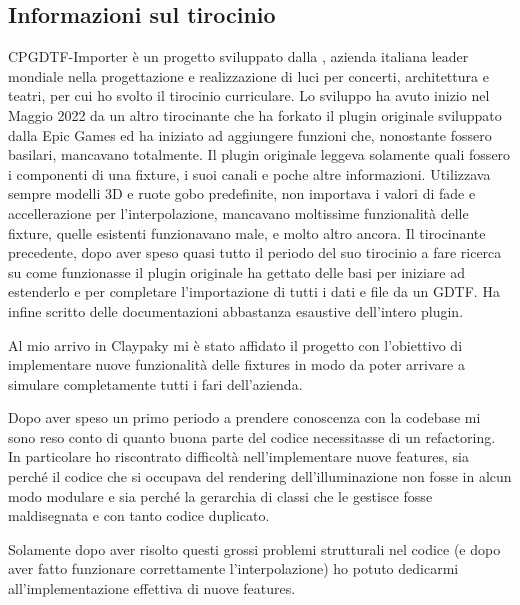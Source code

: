 \documentclass[main.tex]{subfiles}
\begin{document}
\subsection{Informazioni sul tirocinio}\label{subsec:1_tirocinio}
CPGDTF-Importer è un progetto sviluppato dalla , azienda italiana leader mondiale nella progettazione e realizzazione di luci per concerti, architettura e teatri, per cui ho svolto il tirocinio curriculare. Lo sviluppo ha avuto inizio nel Maggio 2022 da un altro tirocinante che ha forkato il plugin originale sviluppato dalla Epic Games ed ha iniziato ad aggiungere funzioni che, nonostante fossero basilari, mancavano totalmente. Il plugin originale leggeva solamente quali fossero i componenti di una fixture, i suoi canali e poche altre informazioni. Utilizzava sempre modelli 3D e ruote gobo predefinite, non importava i valori di fade e accellerazione per l'interpolazione, mancavano moltissime funzionalità delle fixture, quelle esistenti funzionavano male, e molto altro ancora. Il tirocinante precedente, dopo aver speso quasi tutto il periodo del suo tirocinio a fare ricerca su come funzionasse il plugin originale ha gettato delle basi per iniziare ad estenderlo e per completare l'importazione di tutti i dati e file da un GDTF. Ha infine scritto delle documentazioni abbastanza esaustive dell'intero plugin.\newline

Al mio arrivo in Claypaky mi è stato affidato il progetto con l'obiettivo di implementare nuove funzionalità delle fixtures in modo da poter arrivare a simulare completamente tutti i fari dell'azienda.

Dopo aver speso un primo periodo a prendere conoscenza con la codebase mi sono reso conto di quanto buona parte del codice necessitasse di un refactoring. In particolare ho riscontrato difficoltà nell'implementare nuove features, sia perché il codice che si occupava del rendering dell'illuminazione non fosse in alcun modo modulare e sia perché la gerarchia di classi che le gestisce fosse maldisegnata e con tanto codice duplicato. 

Solamente dopo aver risolto questi grossi problemi strutturali nel codice (e dopo aver fatto funzionare correttamente l'interpolazione) ho potuto dedicarmi all'implementazione effettiva di nuove features. 
\end{document}
